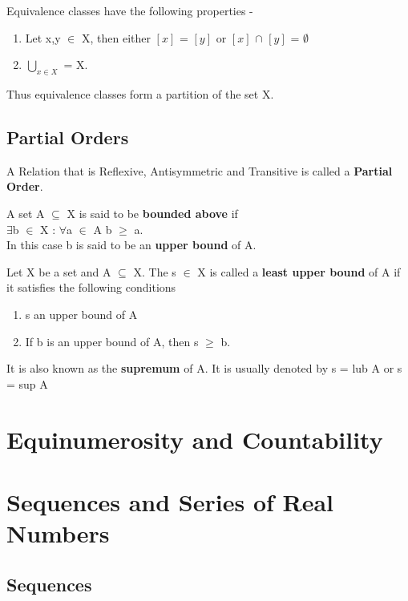 \documentclass{report}
\begin{document}
Equivalence classes have the following properties - 
\begin{enumerate}
\item Let x,y $\in$ X, then either $\left[x\right]$ = $\left[y\right]$ or $\left[x\right]$ $\cap$ $\left[y\right]$ = $\emptyset$
\item $\bigcup_{x \in X}$ = X.
\end{enumerate}
Thus equivalence classes form a partition of the set X.

\section{Partial Orders}
\begin{definition}
A Relation that is Reflexive, Antisymmetric and Transitive is called a  \textbf{Partial Order}.
\end{definition}

\begin{definition}
A set A $\subseteq$ X is said to be \textbf{bounded above} if \\$\exists$b $\in$ X : $\forall$a $\in$ A  b $\geq$ a.\\
In this case b is said to be an \textbf{upper bound} of A.
\end{definition}

\begin{definition}
Let X be a set and A $\subseteq$ X. The s $\in$ X is called a \textbf{least upper bound} of A if it satisfies the following conditions
\begin{enumerate}
\item s an upper bound of A
\item If b is an upper bound of A, then s $\geq$ b.
\end{enumerate}
It is also known as the \textbf{supremum} of A. It is usually denoted by s = lub A or s = sup A
\end{definition}

\chapter{Equinumerosity and Countability}

\chapter{Sequences and Series of Real Numbers}
\section{Sequences}
\end{document}
